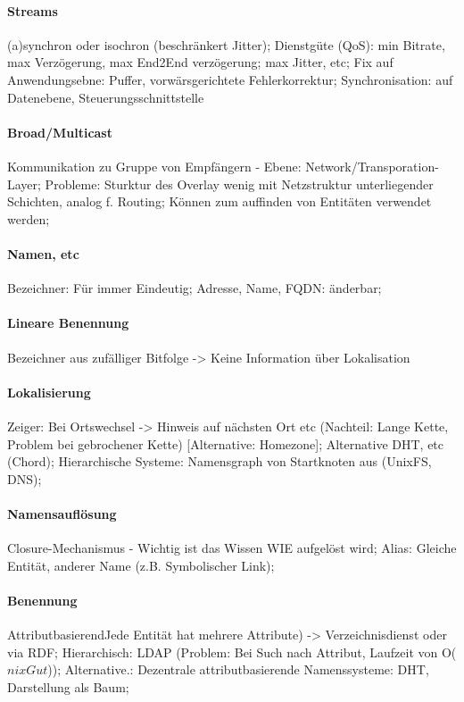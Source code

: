 \documentclass[pagesize,11pt,a4paper]{scrartcl}
\begin{document}
\paragraph*{Streams}
	(a)synchron oder isochron (beschränkert Jitter);
	Dienstgüte (QoS): min Bitrate, max Verzögerung, max End2End verzögerung; max Jitter, etc;
	Fix auf Anwendungsebne: Puffer, vorwärsgerichtete Fehlerkorrektur;
	Synchronisation: auf Datenebene, Steuerungsschnittstelle

\paragraph*{Broad/Multicast}
	Kommunikation zu Gruppe von Empfängern - Ebene: Network/Transporation-Layer;
	Probleme: Sturktur des Overlay wenig mit Netzstruktur unterliegender Schichten, analog f. Routing;
	Können zum auffinden von Entitäten verwendet werden;

\paragraph*{Namen, etc}
	Bezeichner: Für immer Eindeutig;
	Adresse, Name, FQDN: änderbar;

\paragraph*{Lineare Benennung}
	Bezeichner aus zufälliger Bitfolge -> Keine Information über Lokalisation

\paragraph*{Lokalisierung}
	Zeiger: Bei Ortswechsel -> Hinweis auf nächsten Ort etc (Nachteil: Lange Kette, Problem bei gebrochener Kette) [Alternative: Homezone];
	Alternative DHT, etc (Chord);
	Hierarchische Systeme: Namensgraph von Startknoten aus (UnixFS, DNS);

\paragraph*{Namensauflösung}
	Closure-Mechanismus - Wichtig ist das Wissen WIE aufgelöst wird;
	Alias: Gleiche Entität, anderer Name (z.B. Symbolischer Link);

\paragraph*{Benennung}
	AttributbasierendJede Entität hat mehrere Attribute) -> Verzeichnisdienst oder via RDF;
	Hierarchisch: LDAP (Problem: Bei Such nach Attribut, Laufzeit von O($nixGut$));
	Alternative.: Dezentrale attributbasierende Namenssysteme: DHT, Darstellung als Baum;
\end{document}
